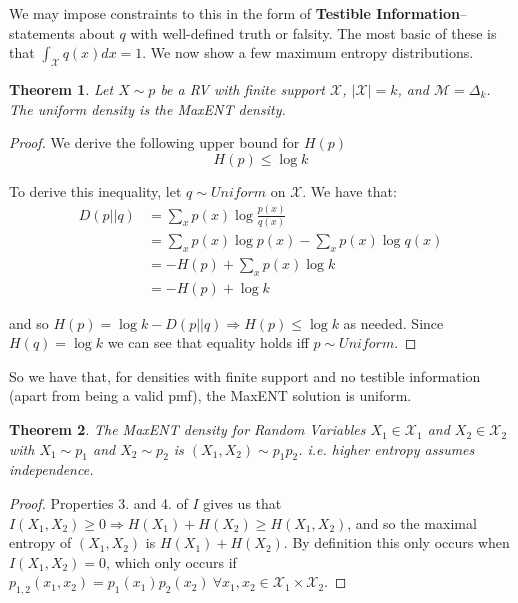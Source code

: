 \documentclass[]{article}
\theoremstyle{mattstyle}
\newtheorem{theorem}{Theorem}[section]
\theoremstyle{definition}
\begin{document}
We may impose constraints to this in the form of \textbf{Testible Information}-- statements about $q$ with well-defined truth or falsity. The most basic of these is that $\int_{\mathcal{X}}^{} q(x)dx = 1$. We now show a few maximum entropy distributions. 

\newpage

\begin{theorem}\label{th:unifentlim}
Let $X\sim p$ be a RV with finite support $\mathcal{X}$, $|\mathcal{X}|=k$, and $\mathcal{M} = \Delta_{k}$. The uniform density is the MaxENT density.
\end{theorem}

\begin{proof}
	We derive the following upper bound for \(H(p)\)
	\begin{equation}
	H(p) \le \log k
	\end{equation}
	
	To derive this inequality, let \(q\sim Uniform\) on $\mathcal{X}$. We have that:
	\begin{align*}
	D(p||q)&=\sum_{x}p(x)\log\frac{p(x)}{q(x)}\\
	&=\sum_{x}p(x)\log p(x)-\sum_xp(x)\log q(x)\\
	&= -H(p) + \sum_xp(x)\log k \\
	&= -H(p) + \log k
	\end{align*}
	
	and so \(H(p)=\log k-D(p||q) \Rightarrow H(p) \le \log k \) as needed. Since $H(q) = \log k$ we can see that equality holds iff $p \sim Uniform$.
\end{proof}

So we have that, for densities with finite support and no testible information (apart from being a valid pmf), the MaxENT solution is uniform.


\begin{theorem}
	The MaxENT density for Random Variables $X_1 \in \mathcal{X}_1$ and $X_2 \in \mathcal{X}_2$ with $X_1 \sim p_1$ and $X_2 \sim p_2$ is \( (X_1,X_2)\sim p_1p_2 \). i.e. higher entropy assumes independence.
\end{theorem}

\begin{proof}
Properties 3. and 4. of $I$ gives us that \(I(X_1,X_2)\ge0 \Rightarrow H(X_1) + H(X_2) \ge H(X_1,X_2) \), and so the maximal entropy of \((X_1,X_2)\) is \(H(X_1) + H(X_2)\). By definition this only occurs when \(I(X_1,X_2)=0\), which only occurs if
\(p_{1,2}(x_1,x_2)=p_1(x_1)p_2(x_2) \ \forall x_1,x_2 \in \mathcal{X}_1\times\mathcal{X}_2\).
\end{proof}
\end{document}
